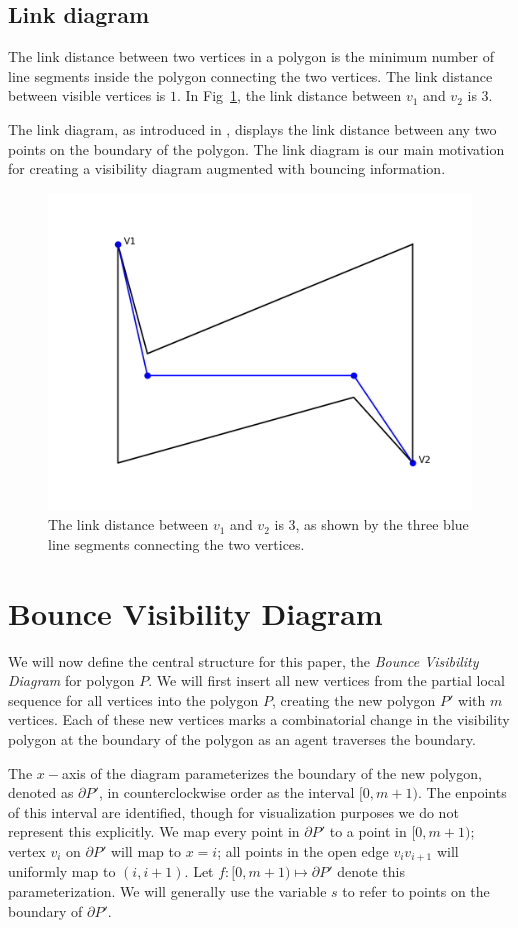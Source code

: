\documentclass[]{styles/svproc}  %
\begin{document}
\subsection{Link diagram}

The link distance between two vertices in a polygon is the minimum number of line segments inside the polygon connecting the two vertices. The link distance between visible vertices is $1$. In Fig~\ref{fig:link_dis}, the link distance between $v_1$ and $v_2$ is 3.

The link diagram, as introduced in \cite{tan_sweep}, displays the link distance between any two points on the boundary of the polygon. The link diagram is our main motivation for creating a visibility diagram augmented with bouncing information.
\begin{figure}
    \includegraphics[width=0.6\linewidth]{figures/link_distance.png}
    \centering
    \caption{The link distance between $v_1$ and $v_2$ is 3, as shown by the three blue line segments connecting the two vertices.}\label{fig:link_dis}
    \centering
\end{figure}

\section{Bounce Visibility Diagram \label{bvd_def}}
We will now define the central structure for this paper, the
\textit{Bounce Visibility Diagram} for polygon $P$. We will first insert all new
vertices from the partial local sequence for all vertices into the
polygon $P$, creating the new polygon $P'$ with $m$ vertices. Each of these new
vertices marks a combinatorial change in the visibility polygon at the boundary
of the polygon as an agent traverses the boundary.

The $x-$axis of the diagram parameterizes the boundary of the new polygon,
denoted as $\partial P'$, in counterclockwise order as the interval $[0, m+1)$. The
enpoints of this interval are identified, though for visualization purposes we
do not represent this explicitly. We map every
point in $\partial P'$ to a point in $[0, m+1)$; vertex $v_i$ on $\partial P'$
will map to $x = i$; all points in the open edge $v_iv_{i+1}$ will uniformly map
to $(i, i+1)$. Let $f: [0, m+1)\mapsto \partial P'$ denote this
parameterization. We will generally use the variable $s$ to refer to points on
the boundary of $\partial P'$.
\end{document}
